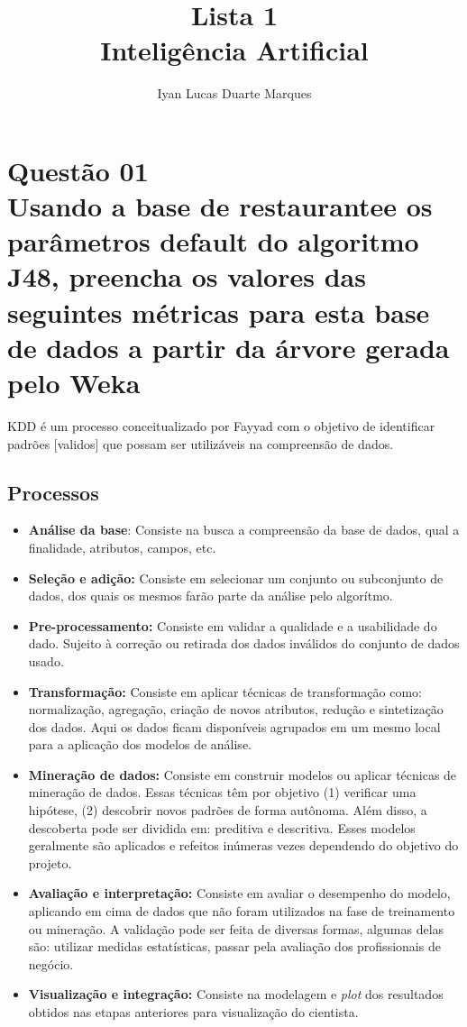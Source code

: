 \documentclass[12pt]{article}
\title{Lista 1\\ Inteligência Artificial}
\author{Iyan Lucas Duarte Marques\inst{1}}
\begin{document}
\maketitle

\section{Questão 01\\
Usando a base de restaurantee os parâmetros default do algoritmo J48, preencha os valores das seguintes métricas para esta base de dados a partir da árvore gerada pelo Weka
}
KDD é um processo conceitualizado por Fayyad com o objetivo de identificar padrões [validos] que possam ser utilizáveis na compreensão de dados.
\subsection{Processos}
\begin{itemize}
    \item \textbf{Análise da base}:
    Consiste na busca a compreensão da base de dados, qual a finalidade, atributos, campos, etc. 
    \item \textbf{Seleção e adição:}
    Consiste em selecionar um conjunto ou subconjunto de dados, dos quais os mesmos farão parte da análise pelo algorítmo.
    \item \textbf{Pre-processamento:}
    Consiste em validar a qualidade e a usabilidade do dado. 
    Sujeito à correção ou retirada dos dados inválidos do conjunto de dados usado.
    \item \textbf{Transformação:}
    Consiste em aplicar técnicas de transformação como: normalização, agregação, criação de novos atributos, redução e sintetização dos dados.
    Aqui os dados ficam disponíveis agrupados em um mesmo local para a aplicação dos modelos de análise.
    \item \textbf{Mineração de dados:}
    Consiste em construir modelos ou aplicar técnicas de mineração de dados. Essas técnicas têm por objetivo (1) verificar uma hipótese, (2) descobrir novos padrões de forma autônoma.
    Além disso, a descoberta pode ser dividida em: preditiva e descritiva.
    Esses modelos geralmente são aplicados e refeitos inúmeras vezes dependendo do objetivo do projeto.
    \item \textbf{Avaliação e interpretação:}
    Consiste em avaliar o desempenho do modelo, aplicando em cima de dados que não foram utilizados na fase de treinamento ou mineração.
    A validação pode ser feita de diversas formas, algumas delas são: utilizar medidas estatísticas, passar pela avaliação dos profissionais de negócio.
    \item \textbf{Visualização e integração:}
    Consiste na modelagem e \textit{plot} dos resultados obtidos nas etapas anteriores para visualização do cientista.
\end{itemize}
\end{document}

